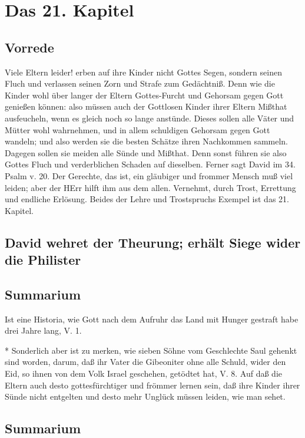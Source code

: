 \chapter{Das 21. Kapitel}

\section{Vorrede}

Viele Eltern leider! erben auf ihre Kinder nicht Gottes Segen, sondern seinen Fluch und verlassen seinen Zorn und Strafe zum Gedächtniß. Denn wie die Kinder wohl über langer der Eltern Gottes-Furcht und Gehorsam gegen Gott genießen können: also müssen auch der Gottlosen Kinder ihrer Eltern Mißthat ausfeucheln, wenn es gleich noch so lange anstünde. Dieses sollen alle Väter und Mütter wohl wahrnehmen, und in allem schuldigen Gehorsam gegen Gott wandeln; und also werden sie die besten Schätze ihren Nachkommen sammeln. Dagegen sollen sie meiden alle Sünde und Mißthat. Denn sonst führen sie also Gottes Fluch und verderblichen Schaden auf dieselben. Ferner sagt David im 34. Psalm v. 20. Der Gerechte, das ist, ein gläubiger und frommer Mensch muß viel leiden; aber der HErr hilft ihm aus dem allen. Vernehmt, durch Trost, Errettung und endliche Erlösung. Beides der Lehre und Trostspruchs Exempel ist das 21. Kapitel.

\section[David wehret der Theurung; erhält Siege wider die]{David wehret der Theurung; erhält Siege wider die Philister}

\section{Summarium}

Ist eine Historia, wie Gott nach dem Aufruhr das Land mit Hunger gestraft habe drei Jahre lang, V. 1.

* Sonderlich aber ist zu merken, wie sieben Söhne vom Geschlechte Saul gehenkt sind worden, darum, daß ihr Vater die Gibeoniter ohne alle Schuld, wider den Eid, so ihnen von dem Volk Israel geschehen, getödtet hat, V. 8. Auf daß die Eltern auch desto gottesfürchtiger und frömmer lernen sein, daß ihre Kinder ihrer Sünde nicht entgelten und desto mehr Unglück müssen leiden, wie man sehet.

\section{Summarium}

